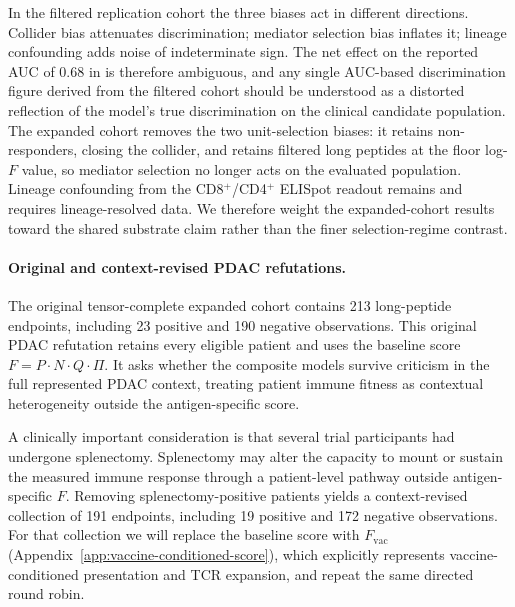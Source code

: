 \documentclass[11pt]{article}
\begin{document}
In the filtered replication cohort the three biases act in different
directions. Collider bias attenuates
discrimination; mediator selection bias inflates it; lineage
confounding adds noise of indeterminate sign.
The net effect on the reported AUC of 0.68 in \citep{rojas2023personalized}
is therefore ambiguous, and any single AUC-based
discrimination figure derived from the filtered cohort should be understood
as a distorted reflection of the model's true discrimination
on the clinical candidate population.
The expanded cohort removes the two unit-selection biases: it
retains non-responders, closing the collider, and retains
filtered long peptides at the floor log-$F$ value, so mediator
selection no longer acts on the evaluated population. Lineage
confounding from the CD8$^{+}$/CD4$^{+}$ ELISpot readout remains and requires
lineage-resolved data. We therefore weight the expanded-cohort results toward
the shared substrate claim rather than the finer selection-regime contrast.

\paragraph{Original and context-revised PDAC refutations.}

The original tensor-complete expanded cohort contains
213 long-peptide endpoints, including 23 positive and 190 negative
observations. This original PDAC refutation retains every eligible patient and
uses the baseline score \(F=P\cdot N\cdot Q\cdot\Pi\). It asks whether the
composite models survive criticism in the full represented
PDAC context, treating patient immune fitness as contextual heterogeneity
outside the antigen-specific score.

A clinically important consideration is that several trial participants had
undergone splenectomy. Splenectomy may alter the capacity to mount or sustain
the measured immune response through a patient-level pathway outside
antigen-specific \(F\). Removing splenectomy-positive patients yields a
context-revised collection of 191 endpoints, including 19 positive and 172
negative observations. For that collection we will replace the baseline score
with \(F_{\mathrm{vac}}\) (Appendix~\ref{app:vaccine-conditioned-score}), which
explicitly represents vaccine-conditioned presentation and TCR expansion,
and repeat the same directed round robin.
\end{document}
